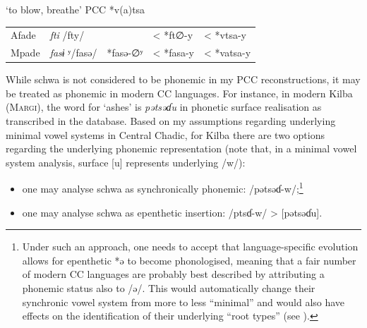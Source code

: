 \documentclass[output=paper]{langscibook}
\begin{document}
\ea%
\label{ex:wolff:6} ‘to blow, breathe’  PCC *v(a)tsa
\begin{tabular}{lllll}
Afade & \textit{fti}     /fty/ &  & < *ft∅-y & < *vtsa-y\\
Mpade & \textit{fasɨ}  ʸ/fasə/ & *fasə-∅ʸ & < *fasa-y & < *vatsa-y\\
\end{tabular}\noindent

\z

While schwa is not considered to be phonemic in my PCC reconstructions, it may be treated as phonemic in modern CC languages. For instance, in modern Kilba (\textsc{Margi}), the word for ‘ashes’ is \textit{pətsəɗu} in phonetic surface realisation as transcribed in the database. Based on my assumptions regarding underlying minimal vowel systems in Central Chadic, for Kilba there are two options regarding the underlying phonemic representation (note that, in a minimal vowel system analysis, surface [u] represents underlying /w/):

\begin{itemize}
  \item  one may analyse schwa as synchronically phonemic: /pətsəɗ-w/;\footnote{Under such an approach, one needs to accept that language-specific evolution allows for epenthetic *ə to become phonologised, meaning that a fair number of modern CC languages are probably best described by attributing a phonemic status also to /ə/. This would automatically change their synchronic vowel system from more to less ``minimal'' and would also have effects on the identification of their underlying ``root types'' (see ).}
 \item one may analyse schwa as epenthetic insertion: /ptsɗ-w/ > [pətsəɗu].
\end{itemize}
\end{document}
